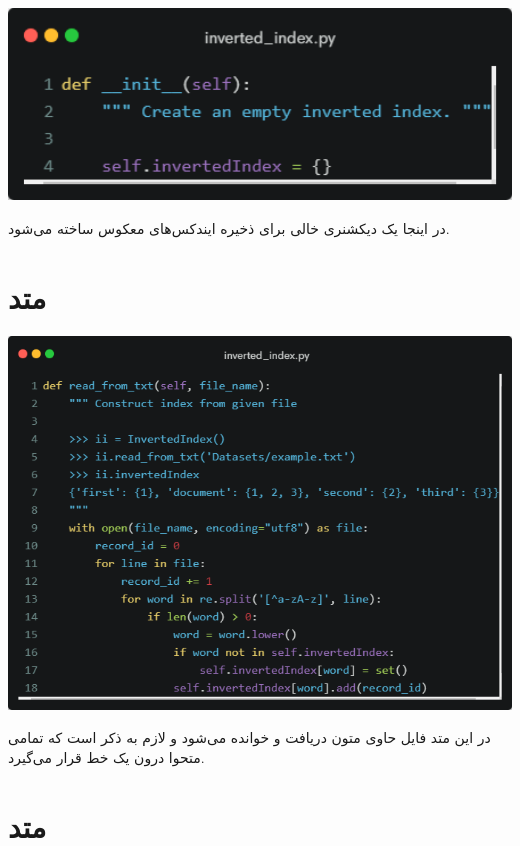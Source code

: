 \documentclass[12pt, dvipsnames, svgnames, x11names,]{article}
\begin{document}
		{\includegraphics[width=14cm]{images/2.png}} \par
		{\normalsize در اینجا یک دیکشنری خالی برای ذخیره ایندکس‌های معکوس ساخته می‌شود.}
	
	
	\section{متد }
	
		{\includegraphics[width=14cm]{images/3.png}} \par
		{\normalsize
			در این متد فایل حاوی متون دریافت و خوانده می‌شود و لازم به ذکر است که تمامی متحوا درون یک خط قرار می‌گیرد.
		} \par

	
	
	\section{متد }
	
\end{document}
